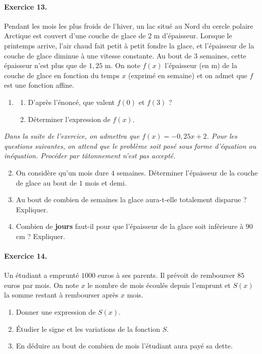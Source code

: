 \documentclass[11pt]{article}
\begin{document}
\paragraph{Exercice 13.} Pendant les mois les plus froids de l'hiver, un lac situé au
Nord du cercle polaire Arctique est couvert d’une couche de glace de $2$ m 
d'épaisseur. Lorsque le printemps arrive, l'air chaud fait petit à petit fondre
la glace, et l'épaisseur de la couche de glace diminue à une vitesse constante.
Au bout de $3$ semaines, cette épaisseur n'est plus que de $1,25$ m. On note
$f(x)$ l'épaisseur (en m) de la couche de glace en fonction du temps $x$
(exprimé en semaine) et on admet que $f$ est une fonction affine.
\begin{enumerate}
  \item \begin{enumerate}
      \item D'après l'énoncé, que valent $f(0)$ et $f(3)$ ?
      \item Déterminer l'expression de $f(x)$.
    \end{enumerate}
\end{enumerate}
\emph{Dans la suite de l'exercice, on admettra que $f(x)=-0,25x+2$. Pour les
questions suivantes, on attend que le problème soit posé sous forme d'équation
ou inéquation. Procéder par t\^atonnement n'est pas accepté.}
\begin{enumerate}
    \setcounter{enumi}{1}
  \item On considère qu'un mois dure $4$ semaines. Déterminer l'épaisseur de la
    couche de glace au bout de $1$ mois et demi.
  \item Au bout de combien de semaines la glace aura-t-elle totalement disparue
    ? Expliquer.
  \item Combien de \textbf{jours} faut-il pour que l'épaisseur de la glace soit
    inférieure à $90$ cm ? Expliquer.
\end{enumerate}

\paragraph{Exercice 14.} Un étudiant a emprunté $1000$ euros à ses parents. Il
prévoit de rembourser $85$ euros par mois. On note $x$ le nombre de mois écoulés
depuis l'emprunt et $S(x)$ la somme restant à rembourser après $x$ mois.
\begin{enumerate}
  \item Donner une expression de $S(x)$.
  \item Étudier le signe et les variations de la fonction $S$.
  \item En déduire au bout de combien de mois l'étudiant aura payé sa dette.
\end{enumerate}
\end{document}
